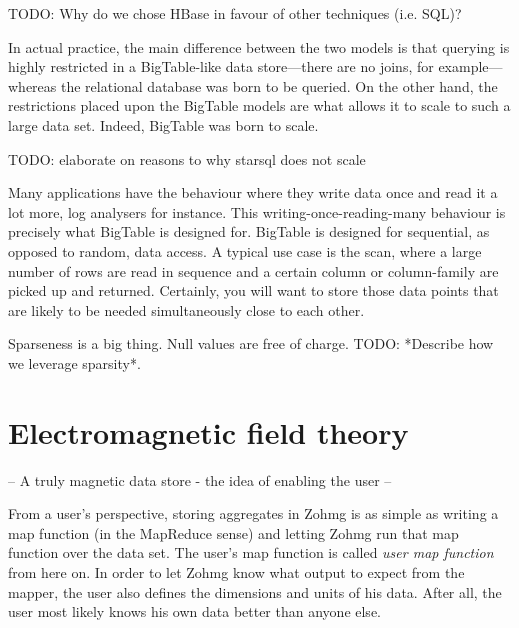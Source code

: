 TODO: Why do we chose HBase in favour of other techniques (i.e. SQL)?

In actual practice, the main difference between the two models is that
querying is highly restricted in a BigTable-like data store---there are no
joins, for example---whereas the relational database was born to be queried.
On the other hand, the restrictions placed upon the BigTable models are
what allows it to scale to such a large data set. Indeed, BigTable was born
to scale.

TODO: elaborate on reasons to why starsql does not scale

Many applications have the behaviour where they write data once and read it
a lot more, log analysers for instance. This writing-once-reading-many
behaviour is precisely what BigTable is designed for. BigTable is designed
for sequential, as opposed to random, data access. A typical use case is
the scan, where a large number of rows are read in sequence and a certain
column or column-family are picked up and returned. Certainly, you will
want to store those data points that are likely to be needed simultaneously
close to each other. \cite{bigtable}

Sparseness is a big thing. Null values are free of charge. TODO: *Describe
how we leverage sparsity*.


\section{Electromagnetic field theory}

-- A truly magnetic data store - the idea of enabling the user --

From a user's perspective, storing aggregates in Zohmg is as simple as writing
a map function (in the MapReduce sense) and letting Zohmg run that map function
over the data set. The user's map function is called \textit{user map function}
from here on. In order to let Zohmg know what output to expect from the mapper,
the user also defines the dimensions and units of his data. After all, the user
most likely knows his own data better than anyone else.




